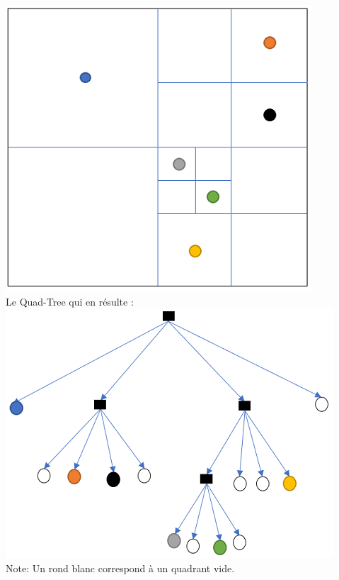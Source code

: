 \begin{Exercice}[10 minutes]
\begin{solution}
    \includegraphics[]{Quad-Tree3Solution1.PNG}\\
    
    Le Quad-Tree qui en résulte :\\
    
    \includegraphics[]{Quad-Tree3Solution2.PNG}\\
    
    Note: Un rond blanc correspond à un quadrant vide.
    
\end{solution}
\end{Exercice}


